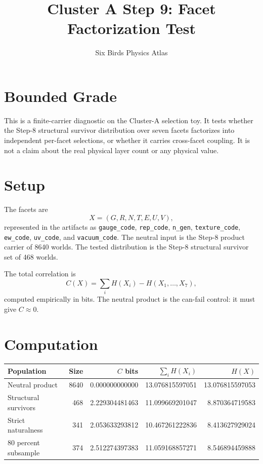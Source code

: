 \documentclass[11pt]{article}
\title{Cluster A Step 9: Facet Factorization Test}
\author{Six Birds Physics Atlas}
\date{}
\begin{document}
\maketitle

\section*{Bounded Grade}

This is a finite-carrier diagnostic on the Cluster-A selection toy. It tests whether the Step-8 structural survivor distribution over seven facets factorizes into independent per-facet selections, or whether it carries cross-facet coupling. It is not a claim about the real physical layer count or any physical value.

\section*{Setup}

The facets are
\[
X=(G,R,N,T,E,U,V),
\]
represented in the artifacts as \texttt{gauge\_code}, \texttt{rep\_code}, \texttt{n\_gen}, \texttt{texture\_code}, \texttt{ew\_code}, \texttt{uv\_code}, and \texttt{vacuum\_code}. The neutral input is the Step-8 product carrier of 8640 worlds. The tested distribution is the Step-8 structural survivor set of 468 worlds.

The total correlation is
\[
C(X)=\sum_i H(X_i)-H(X_1,\ldots,X_7),
\]
computed empirically in bits. The neutral product is the can-fail control: it must give \(C \approx 0\).

\section*{Computation}

\begin{center}
\begin{tabular}{lrrrr}
\toprule
Population & Size & \(C\) bits & \(\sum_i H(X_i)\) & \(H(X)\) \\
\midrule
Neutral product & 8640 & 0.000000000000 & 13.076815597051 & 13.076815597053 \\
Structural survivors & 468 & 2.229304481463 & 11.099669201047 & 8.870364719583 \\
Strict naturalness & 341 & 2.053633293812 & 10.467261222836 & 8.413627929024 \\
80 percent subsample & 374 & 2.512274397383 & 11.059168857271 & 8.546894459888 \\
\bottomrule
\end{tabular}
\end{center}
\end{document}
